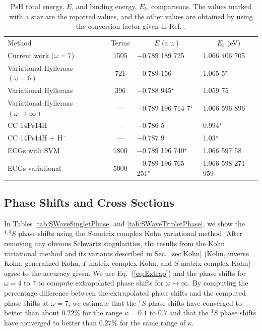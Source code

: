 \documentclass[preprint,showpacs,showkeys,preprintnumbers,amsmath,amssymb,longbibliography,pra,aps]{revtex4-1}
\newcommand*{\thead}[1]{\multicolumn{1}{c}{#1}}
\begin{document}
\squeezetable  %
\begin{table}
\begin{center}
\begin{ruledtabular}  %
\begin{tabular}{l c l l}
Method & Terms & \thead{$E$ (a.u.)} & \thead{$E_b$ (eV)}\\
\colrule
Current work ($\omega = 7$) & 1505 & $-$0.789 189 725 & 1.066 406 705 \\
Variational Hylleraas $(\omega = 6)$ \cite{VanReeth2003} & 721 & $-$0.789 156 & 1.065 5$^\star$ \\
Variational Hylleraas \cite{Ho1986} & 396 & $-$0.788 945$^\star$ & 1.059 75 \\
Variational Hylleraas $(\omega \rightarrow \infty)$ \cite{Yan1999} & --- & $-$0.789 196 714 7$^\star$ & 1.066 596 896 \\
CC 14Ps14H \cite{Blackwood2002} & --- & $-$0.786 5 & 0.994$^\star$ \\
CC 14Ps14H + $\text{H}^-$ \cite{Walters2004} & --- & $-$0.787 9 & 1.03$^\star$\\
ECGs with SVM \cite{Mitroy2006} & 1800 & $-$0.789 196 740$^\star$ & 1.066 597 58 \\
ECGs variational \cite{Bubin2006} & 5000 & $-$0.789 196 765 251$^\star$ & 1.066 598 271 959 \\
\end{tabular}
\end{ruledtabular}
\caption{PsH total energy, $E$, and binding energy, $E_b$, comparisons.
The values marked with a star are the
reported values, and the other values are obtained by using the conversion
factor given in Ref. \cite{Mohr2012,*NISTConversions}.}
\label{tab:BoundEnergy}
\end{center}
\end{table}

\subsection{Phase Shifts and Cross Sections}
\label{sec:PhaseCross}

In Tables \ref{tab:SWaveSingletPhase} and \ref{tab:SWaveTripletPhase}, we 
show the $^{1,3}S$ phase shifts using the $S$-matrix complex Kohn 
variational method. After removing any obvious Schwartz singularities, the
results from the Kohn variational method and its variants
described in Sec.~\ref{sec:Kohn} (Kohn, inverse Kohn, generalized Kohn,
$T$-matrix complex Kohn, and $S$-matrix complex Kohn) agree
to the accuracy given.
We use Eq.~(\ref{eq:Extrap}) and the phase shifts for $\omega = 4$ to 7 to
compute extrapolated phase shifts for $\omega \rightarrow \infty$.
By computing the percentage difference between the
extrapolated phase shifts and the computed phase shifts at $\omega=7$, we
estimate that the $^1S$ phase shifts have converged to better than about
$0.22\%$ for the range $\kappa=0.1$ to $0.7$ and that the $^3S$ phase shifts
have converged to better than $0.27\%$ for the same range of $\kappa$.
\end{document}
